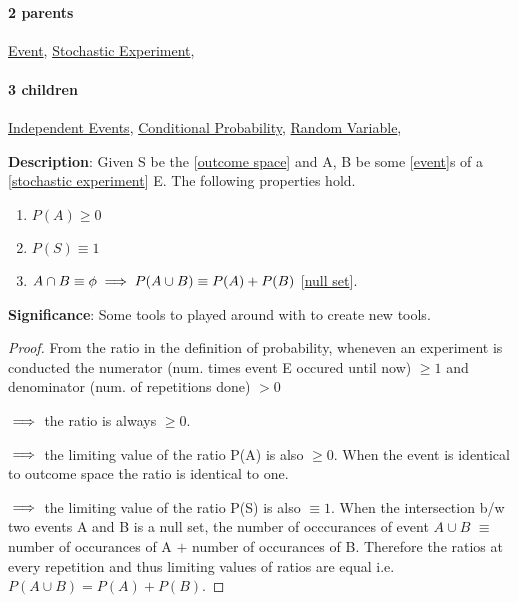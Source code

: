 \documentclass[../main.tex]{subfiles}
\begin{document}
\paragraph{2 parents} \hyperref[statement:Event]{Event}, \hyperref[statement:Stochastic Experiment]{Stochastic Experiment}, 
\paragraph{3 children} \hyperref[statement:Independent Events]{Independent Events}, \hyperref[statement:Conditional Probability]{Conditional Probability}, \hyperref[statement:Random Variable]{Random Variable}, 



\begin{statement}
\label{statement:Properties of probability}\hspace*{0pt}\par
\end{statement}
\textbf{Description}:
Given S be the [\hyperref[statement:Outcome Space]{outcome space}] and A, B be some [\hyperref[statement:Event]{event}]s of a [\hyperref[statement:Stochastic Experiment]{stochastic experiment}] E. The following properties hold.
\begin{enumerate}[nolistsep]
  \item $P(A) \ge 0 $
  \item $P(S) \equiv 1 $
  \item $ A \cap B \equiv \phi \implies P(A \cup B) \equiv P(A) + P(B)$ [\hyperref[statement:Null Set]{null set}].
\end{enumerate}

\par
{\color{magenta} \textbf{Significance}:
Some tools to played around with to create new tools.
\par}
\begin{proof}
From the ratio in the definition of probability, wheneven an experiment is conducted the numerator (num. times event E occured until now) $ \ge 1 $ and denominator (num. of repetitions done) $ > 0 $

$ \implies $ the ratio is always $ \ge 0 $.

$ \implies $ the limiting value of the ratio P(A) is also $ \ge 0 $.
When the event is identical to outcome space the ratio is identical to one.

$ \implies $ the limiting value of the ratio P(S) is also $ \equiv 1 $.
When the intersection b/w two events A and B is a null set, the number of occcurances of event $ A \cup B $ $ \equiv $ number of occurances of A $ + $ number of occurances of B. Therefore the ratios at every repetition and thus limiting values of ratios are equal i.e. $ P(A \cup B) = P(A) + P(B) $.
\end{proof}\par
\end{document}
